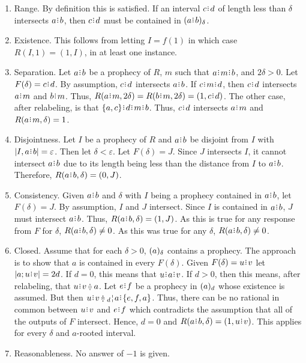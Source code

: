 \documentclass[12pt]{article}
\begin{document}
\begin{enumerate}
    \item Range. By definition this is satisfied.  If an interval $c\rint d$ of length less than $\delta$ intersects $a\rint b$, then $c\rint d$ must be contained in $\halo{a\rint b}$.
    
    \item Existence. This follows from letting $I=f(1)$ in which case $R(I, 1) = (1, I)$, in at least one instance. 
    
    \item Separation. Let $a\rint b$ be a prophecy of $R$, $m$ such that $a\rint m\rint b$, and $2\delta > 0$. Let $F(\delta)= c\rint d$. By assumption, $c\rint d$ intersects $a\rint b$. If $c\rint m\rint d$, then $c\rint d$ intersects $a\rint m$ and $b\rint m$. Thus, $R(a\rint m, 2 \delta) = R(b\rint m, 2\delta) = (1, c\rint d)$. The other case, after relabeling, is that $\{a, c\}\rint d\rint m\rint b$. Thus, $c\rint d$ intersects $a\rint m$ and $R(a\rint m, \delta) = 1$. 
    
    \item Disjointness. Let $I$ be a prophecy of $R$ and $a\rint b$ be disjoint from $I$ with $|I, a\rint b| = \varepsilon$. Then let $\delta < \varepsilon$. Let $F(\delta) = J$. Since $J$ intersects $I$, it cannot intersect $a\rint b$ due to its length being less than the distance from $I$ to $a\rint b$. Therefore, $R(a\rint b, \delta) = (0, J)$. 
    
    \item Consistency. Given $a\rint b$ and $\delta$ with $I$ being a prophecy contained in $a\rint b$, let $F(\delta)= J$. By assumption, $I$ and $J$ intersect. Since $I$ is contained in $a\rint b$, $J$ must intersect $a\rint b$. Thus, $R(a\rint b, \delta) = (1, J)$. As this is true for any response from $F$ for $\delta$, $R(a\rint b, \delta) \neq 0$. As this was true for any $\delta$, $R(a\rint b, \delta) \neq 0$. 
    
    \item Closed. Assume that for each $\delta > 0$, $\halo{a}$ contains a prophecy. The approach is to show that $a$ is contained in every $F(\delta)$. Given $F(\delta) = u\rint v$ let  $|a; u\rint v| = 2d$. If $d = 0$, this means that $u\rint a\rint v$. If $ d > 0$, then this means, after relabeling, that $u\rint v\betneq a$. Let $e\rint f$ be a prophecy in $\halo[d]{a}$ whose existence is assumed. But then $u\rint v \betneq \fuzbleft[d]{a} \rint  \{e, f, a\}$. Thus, there can be no rational in common between $u\rint v$ and $e\rint f$ which contradicts the assumption that all of the outputs of $F$ intersect. Hence, $d =0$ and $R(a\rint b, \delta) = (1, u\rint v)$. This applies for every $\delta$ and $a$-rooted interval. 
    
    \item Reasonableness. No answer of $-1$ is given. 
\end{enumerate}
\end{document}
